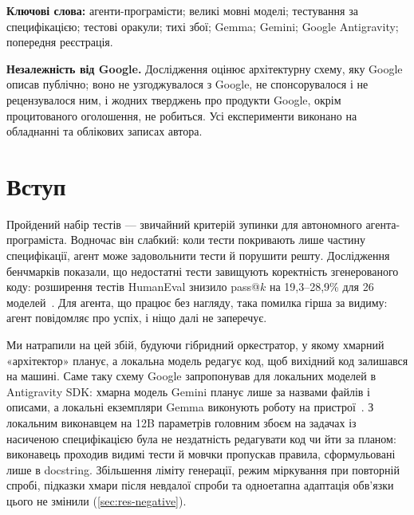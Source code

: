 \documentclass[11pt]{article}
\begin{document}
\noindent\textbf{Ключові слова:} агенти-програмісти; великі мовні моделі; тестування за специфікацією; тестові оракули; тихі збої; Gemma; Gemini; Google Antigravity; попередня реєстрація.

\medskip
\noindent\textbf{Незалежність від Google.} Дослідження оцінює архітектурну схему, яку Google описав публічно; воно не узгоджувалося з Google, не спонсорувалося і не рецензувалося ним, і жодних тверджень про продукти Google, окрім процитованого оголошення, не робиться. Усі експерименти виконано на обладнанні та облікових записах автора.

\section{Вступ}\label{sec:intro}
Пройдений набір тестів --- звичайний критерій зупинки для автономного агента-програміста. Водночас він слабкий: коли тести покривають лише частину специфікації, агент може задовольнити тести й порушити решту. Дослідження бенчмарків показали, що недостатні тести завищують коректність згенерованого коду: розширення тестів HumanEval знизило pass@$k$ на 19{,}3--28{,}9\% для 26 моделей~\citep{liu2023evalplus}. Для агента, що працює без нагляду, така помилка гірша за видиму: агент повідомляє про успіх, і ніщо далі не заперечує.

Ми натрапили на цей збій, будуючи гібридний оркестратор, у якому хмарний «архітектор» планує, а локальна модель редагує код, щоб вихідний код залишався на машині. Саме таку схему Google запропонував для локальних моделей в Antigravity SDK: хмарна модель Gemini планує лише за назвами файлів і описами, а локальні екземпляри Gemma виконують роботу на пристрої~\citep{kotwani2026antigravity}. З локальним виконавцем на 12B параметрів головним збоєм на задачах із насиченою специфікацією була не нездатність редагувати код чи йти за планом: виконавець проходив видимі тести й мовчки пропускав правила, сформульовані лише в docstring. Збільшення ліміту генерації, режим міркування при повторній спробі, підказки хмари після невдалої спроби та одноетапна адаптація обв'язки цього не змінили (\cref{sec:res-negative}).
\end{document}
